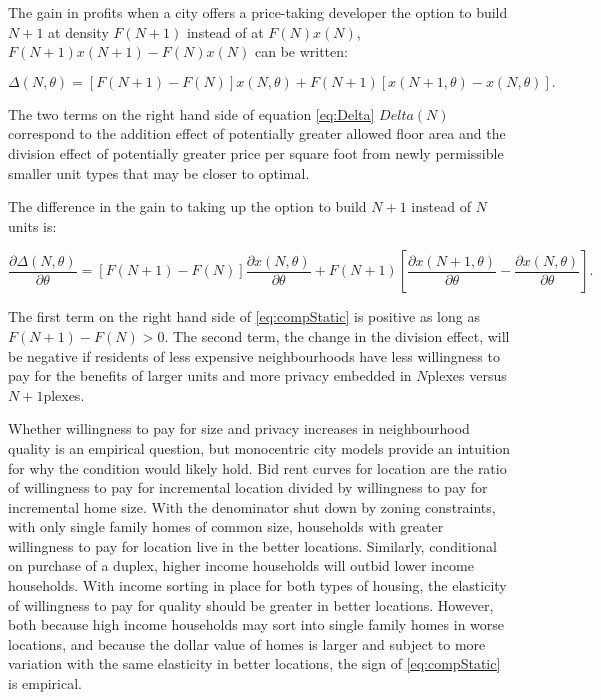\documentclass[12pt]{article}
\begin{document}
The gain in profits when a city offers a price-taking developer the option to build $N+1$ at density $F(N+1)$ instead of at $F(N)x(N)$, $F(N+1)x(N+1) -
F(N)x(N)$ can be written: 

\begin{equation}
	\label{eq:Delta}
	\Delta(N,\theta) = \left[F(N+1)-F(N)\right]x(N,\theta) + F(N+1)\left[x(N+1,\theta)-x(N,\theta)\right].
\end{equation}

The two terms on the right hand side of equation \eqref{eq:Delta} $Delta(N)$ correspond to the addition effect of potentially
greater allowed floor area and the division effect of potentially greater price
per square foot from newly permissible smaller unit types that may be closer to
optimal.

The difference in the gain to taking up the option to build $N+1$ instead of $N$ units is:

\begin{equation}
	\label{eq:compStatic}
	\frac{\partial \Delta(N,\theta)}{\partial \theta} = \left[F(N+1)-F(N)\right]\frac{\partial x(N,\theta)}{\partial \theta} + F(N+1)\left[\frac{\partial x(N+1,\theta)}{\partial \theta}-\frac{\partial x(N,\theta)}{\partial \theta}\right].
\end{equation}

The first term on the right hand side of \eqref{eq:compStatic} is positive as
long as $F(N+1)-F(N)>0$. The second term, the change in the division effect,
will be negative if residents of less expensive neighbourhoods have less
willingness to pay for the benefits of larger units and more privacy embedded
in $N$plexes versus $N+1$plexes.

Whether willingness to pay for size and privacy increases in neighbourhood
quality is an empirical question, but monocentric city models provide an
intuition for why the condition would likely hold. Bid rent curves for location are the
ratio of willingness to pay for incremental location divided by willingness to
pay for incremental home size. With the denominator shut down by zoning
constraints, with only single family homes of common size, households with
greater willingness to pay for location live in the better locations.
Similarly, conditional on purchase of a duplex, higher income households will
outbid lower income households. With income sorting in place for both types of
housing, the elasticity of willingness to pay for quality should be greater in
better locations. However, both because high income households may sort into
single family homes in worse locations, and because the dollar value
of homes is larger and subject to more variation with the same elasticity in
better locations, the sign of \eqref{eq:compStatic} is empirical.
\end{document}

